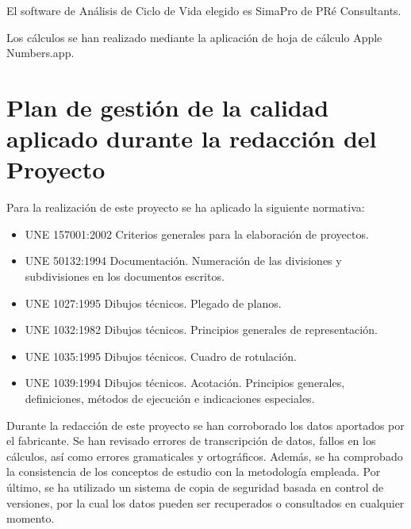 El software de Análisis de Ciclo de Vida elegido es SimaPro de PRé Consultants.

Los cálculos se han realizado mediante la aplicación de hoja de cálculo Apple Numbers.app.

\section{Plan de gestión de la calidad aplicado durante la redacción del Proyecto}

Para la realización de este proyecto se ha aplicado la siguiente normativa:
\begin{itemize}
  \item UNE 157001:2002 Criterios generales para la elaboración de proyectos.
  \item UNE 50132:1994 Documentación. Numeración de las divisiones y subdivisiones en los documentos escritos.
  \item UNE 1027:1995 Dibujos técnicos. Plegado de planos.
  \item UNE 1032:1982 Dibujos técnicos. Principios generales de representación.
  \item UNE 1035:1995 Dibujos técnicos. Cuadro de rotulación.
  \item UNE 1039:1994 Dibujos técnicos. Acotación. Principios generales, definiciones, métodos de ejecución e indicaciones especiales.
\end{itemize}

Durante la redacción de este proyecto se han corroborado los datos aportados por el fabricante. Se han revisado errores de transcripción de datos, fallos en los cálculos, así como errores gramaticales y ortográficos. Además, se ha comprobado la consistencia de los conceptos de estudio con la metodología empleada. Por último, se ha utilizado un sistema de copia de seguridad basada en control de versiones, por la cual los datos pueden ser recuperados o consultados en cualquier momento.

